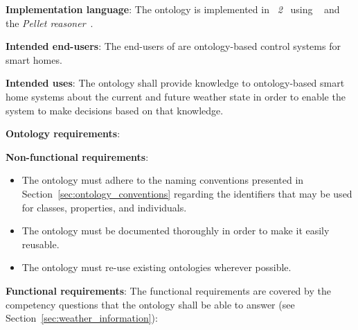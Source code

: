 \begin{mdframed}[linewidth=.6pt]
\vspace{.3cm}

\textbf{Implementation language}: The ontology is implemented in \emph{~2}~\cite{OWL} using \protege~\cite{protege} and the \emph{Pellet reasoner}~\cite{pellet}.

\vspace{.3cm}

\textbf{Intended end-users}: The end-users of \smarthomeweather are ontology-based control systems for smart homes.

\vspace{.3cm}

\textbf{Intended uses}: The ontology shall provide knowledge to ontology-based smart home systems about the current and future weather state in order to enable the system to make decisions based on that knowledge.

\vspace{.3cm}

\textbf{Ontology requirements}:

\vspace{.3cm}

\setlength{\leftskip}{.5cm}

\textbf{Non-functional requirements}:

\begin{itemize}
  \item The ontology must adhere to the naming conventions presented in Section~\ref{sec:ontology_conventions} regarding the identifiers that may be used for classes, properties, and individuals.
  \item The ontology must be documented thoroughly in order to make it easily reusable.
  \item The ontology must re-use existing ontologies wherever possible.
\end{itemize}

\textbf{Functional requirements}: The functional requirements are covered by the competency questions that the ontology shall be able to answer (see Section~\ref{sec:weather_information}):


\end{mdframed}
